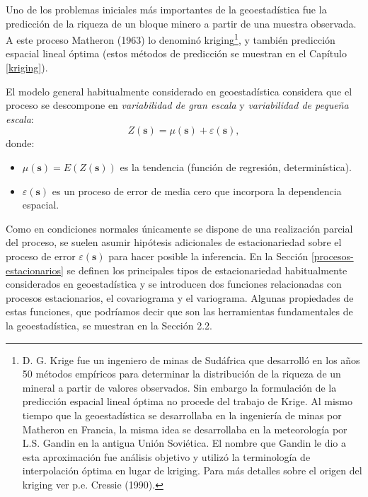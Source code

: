 \documentclass[
  spanish,
]{book}
\theoremstyle{break}
\theoremstyle{definition}
\theoremstyle{definition}
\theoremstyle{definition}
\theoremstyle{definition}
\theoremstyle{remark}
\begin{document}
Uno de los problemas iniciales más importantes de la geoestadística fue la predicción de la riqueza de un bloque minero a partir de una muestra observada.
A este proceso Matheron (1963) lo denominó kriging\footnote{D. G. Krige fue un ingeniero de minas de Sudáfrica que desarrolló
  en los años 50 métodos empíricos para determinar la distribución de
  la riqueza de un mineral a partir de valores observados.
  Sin embargo la formulación de la predicción espacial lineal óptima no
  procede del trabajo de Krige.
  Al mismo tiempo que la geoestadística se desarrollaba en la ingeniería
  de minas por Matheron en Francia, la misma idea se desarrollaba en la
  meteorología por L.S. Gandin en la antigua Unión Soviética.
  El nombre que Gandin le dio a esta aproximación fue análisis objetivo
  y utilizó la terminología de interpolación óptima en lugar de kriging.
  Para más detalles sobre el origen del kriging ver p.e. Cressie (1990).}, y también predicción espacial lineal óptima (estos métodos de predicción se muestran en el Capítulo \ref{kriging}).

El modelo general habitualmente considerado en geoestadística considera que el proceso se descompone en \emph{variabilidad de gran escala} y \emph{variabilidad de pequeña escala}:
\begin{equation}
  Z(\mathbf{s}) = \mu(\mathbf{s}) + \varepsilon(\mathbf{s}),
  \label{eq:modelogeneral}
\end{equation}
donde:

\begin{itemize}
\item
  \(\mu(\mathbf{s}) = E \left( Z(\mathbf{s}) \right)\) es la tendencia (función de regresión, determinística).
\item
  \(\varepsilon(\mathbf{s})\) es un proceso de error de media cero que incorpora la dependencia espacial.
\end{itemize}

Como en condiciones normales únicamente se dispone de una realización parcial del proceso, se suelen asumir hipótesis adicionales de estacionariedad sobre el proceso de error \(\varepsilon(\mathbf{s})\) para hacer posible la inferencia.
En la Sección \ref{procesos-estacionarios} se definen los principales tipos de estacionariedad habitualmente considerados en geoestadística y se introducen dos funciones relacionadas con procesos estacionarios, el covariograma y el variograma.
Algunas propiedades de estas funciones, que podríamos decir que son las herramientas fundamentales de la geoestadística, se muestran en la Sección 2.2.
\end{document}
